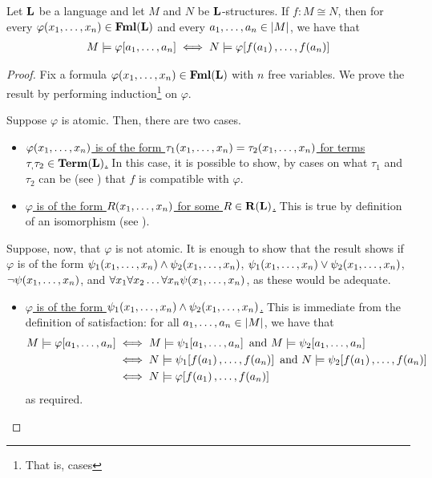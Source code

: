 \begin{boxtheorem}
    Let $\mathbf{L}$ be a language and let $M$ and $N$ be $\mathbf{L}$-structures. If $f:M \cong N$, then for every $\varphi\!\left( x_1, \ldots, x_n \right) \in \mathbf{Fml}\!\left( \mathbf{L} \right)$ and every $a_1, \ldots, a_n \in \left\lvert M \right\rvert$, we have that
    \begin{align*}
        M \models \varphi\!\left[ a_1, \ldots, a_n \right]
        \iff 
        N \models \varphi\!\left[ f\!\left( a_1 \right), \ldots, f\!\left( a_n \right) \right]
    \end{align*}
\end{boxtheorem}
\begin{proof}
    Fix a formula $\varphi\!\left( x_1, \ldots, x_n \right) \in \mathbf{Fml}\!\left( \mathbf{L} \right)$ with $n$ free variables. We prove the result by performing induction\footnote{That is, cases} on $\varphi$.
    
    Suppose $\varphi$ is atomic. Then, there are two cases.
    \begin{itemize}
        \item \underline{$\varphi\!\left( x_1, \ldots, x_n \right)$ is of the form $\tau_1\!\left( x_1, \ldots, x_n \right) = \tau_2\!\left( x_1, \ldots, x_n \right)$ for terms $\tau_, \tau_2 \in \mathbf{Term}\!\left( \mathbf{L} \right)$.}
        In this case, it is possible to show, by cases on what $\tau_1$ and $\tau_2$ can be (see ) that $f$ is compatible with $\varphi$.

        \item \underline{$\varphi$ is of the form $R\!\left( x_1, \ldots, x_n \right)$ for some $R \in \mathbf{R}\!\left( \mathbf{L} \right)$.}
        This is true by definition of an isomorphism (see ).
    \end{itemize}

    Suppose, now, that $\varphi$ is not atomic. It is enough to show that the result shows if $\varphi$ is of the form $\psi_1\!\left( x_1, \ldots, x_n \right) \land \psi_2\!\left( x_1, \ldots, x_n \right)$, $\psi_1\!\left( x_1, \ldots, x_n \right) \lor \psi_2\!\left( x_1, \ldots, x_n \right)$, $\neg \psi\!\left( x_1, \ldots, x_n \right)$, and $\forall x_1 \forall x_2 \ldots \forall x_{n} \psi\!\left( x_1, \ldots, x_n \right)$, as these would be adequate.

    \begin{itemize}
        \item \underline{$\varphi$ is of the form $\psi_1\!\left( x_1, \ldots, x_n \right) \land \psi_2\!\left( x_1, \ldots, x_n \right)$.}
        This is immediate from the definition of satisfaction: for all $a_1, \ldots, a_n \in \left\lvert M \right\rvert$, we have that
        \begin{align*}
            M \models \varphi\!\brac{a_1, \ldots, a_n}
            & \iff
            M \models \psi_1\!\brac{a_1, \ldots, a_n}
            \text{ and }
            M \models \psi_2\!\brac{a_1, \ldots, a_n} \\
            & \iff
            N \models \psi_1\!\brac{f\of{a_1}, \ldots, f\of{a_n}}
            \text{ and }
            N \models \psi_2\!\brac{f\of{a_1}, \ldots, f\of{a_n}} \\
            &\iff
            N \models \varphi\!\brac{f\of{a_1}, \ldots, f\of{a_n}}
        \end{align*}
        as required.


\end{itemize}
\end{proof}
